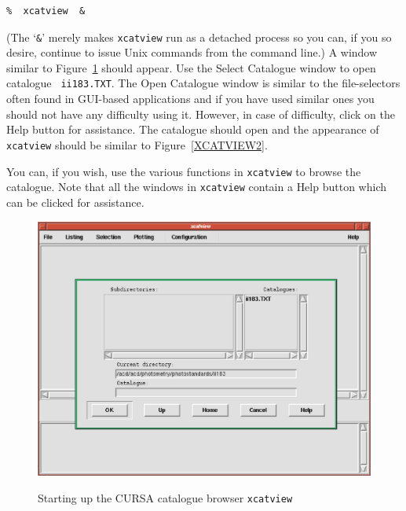 \documentclass[twoside,11pt]{article}
\begin{document}
\begin{enumerate}
\begin{verbatim}
%  xcatview  &
\end{verbatim}

   (The `{\tt \&}' merely makes {\tt xcatview} run as a detached process
   so you can, if you so desire, continue to issue Unix commands from the
   command line.)  A window similar to Figure~\ref{XCATVIEW1} should
   appear.  Use the {\sf Select Catalogue} window to open catalogue {\tt
   ii183.TXT}.  The {\sf Open Catalogue} window is similar to the
   file-selectors often found in GUI-based applications and if you have
   used similar ones you should not have any difficulty using it.
   However, in case of difficulty, click on the {\sf Help} button for
   assistance.  The catalogue should open and the appearance of {\tt
   xcatview} should be similar to Figure~\ref{XCATVIEW2}.

   You can, if you wish, use the various functions in {\tt xcatview}
   to browse the catalogue.  Note that all the windows in {\tt xcatview}
   contain a {\sf Help} button which can be clicked for assistance.

  \begin{figure}[htbp]
     \centering 
     \includegraphics[totalheight=3.25in]{sc6_xcatview1.ps}
     \begin{quote}
     \caption{Starting up the CURSA catalogue browser {\tt xcatview}
     \label{XCATVIEW1} }
     \end{quote}
  \end{figure}


\end{enumerate}
\end{document}
